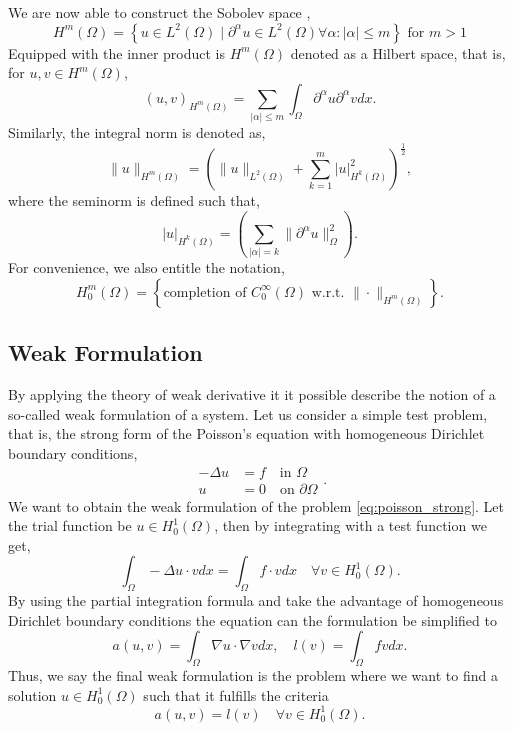 We are now able to construct the Sobolev space \cite{manzoni2021optimal}, \[
H^{m}\left( \Omega  \right) = \left\{ u \in L^{2}\left( \Omega  \right)  \mid  \partial ^{\alpha } u \in L^{2}\left( \Omega  \right)  \forall \alpha : \left\lvert \alpha  \right\rvert  \le m \right\} \text{ for } m>1
\]
Equipped with the inner product is $H^{m}\left( \Omega  \right) $  denoted as a Hilbert space, that is, for $u,v \in H^{m}\left( \Omega  \right) $, \[
    \left( u,v \right) _{H^{m}\left( \Omega   \right) } = \sum_{\left\lvert \alpha  \right\rvert  \le  m}^{}  \int_{\Omega }^{} \partial ^{\alpha } u \partial ^{\alpha } v dx.
\]
Similarly, the integral norm is denoted as, \[
\| u \|_{ H^{m}\left( \Omega  \right)  }^{  }  = \left( \| u \|_{ L^{2}\left( \Omega  \right)    } + \sum_{k = 1}^{m}  \left\lvert u \right\rvert ^{2} _{  H^{k}\left( \Omega  \right) }\right) ^{\frac{1}{2}},
\]
where the seminorm is defined such that, \[
\left\lvert u \right\rvert _{H^{k}\left( \Omega  \right) } = \left( \sum_{\left\lvert \alpha  \right\rvert  = k}^{} \| \partial ^{\alpha }u \|_{ \Omega  }^{ 2 }  \right).
\]
For convenience, we also entitle the notation,
\[
H^{m}_{0} \left( \Omega  \right) = \left\{ \text{completion of }C_{0}^{\infty}\left( \Omega  \right) \text{ w.r.t. } \| \cdot  \|_{H^{m}\left( \Omega  \right)   }^{  }  \right\}.
\]

\subsection{Weak Formulation}%
\label{sub:weak_formulation}

By applying the theory of weak derivative it it possible describe the notion of a so-called weak formulation of a system. Let us consider a simple test problem, that is, the strong form of the Poisson's equation with homogeneous Dirichlet boundary
conditions,
\begin{equation}
\label{eq:poisson_strong}
\begin{split}
-\Delta u & = f \quad \text{in } \Omega \\
u & =0 \quad \text{on } \partial \Omega
\end{split}
.\end{equation}
We want to obtain the weak formulation of the problem \eqref{eq:poisson_strong}. Let the trial function be $u \in H_{0}^{1}\left( \Omega  \right) $, then by integrating with a test function we get, \[
\int_{\Omega }^{} - \Delta u \cdot v dx = \int_{\Omega }^{} f \cdot v dx \quad \forall v \in H^{1}_{0}\left( \Omega  \right).
\]
By using the partial integration formula and take the advantage of homogeneous Dirichlet boundary conditions the equation can the formulation be simplified to \[
a\left( u,v \right) = \int_{\Omega }^{}  \nabla u\cdot \nabla v dx , \quad l\left( v \right)  = \int_{\Omega }^{}  f v dx.
\]
Thus, we say the final weak formulation is the problem where we want to find a solution $u \in H^{1}_{0}\left( \Omega  \right) $  such that it fulfills the criteria
\begin{equation}
\label{eq:poissons_weak_formulation}
a\left( u,v \right) = l\left( v \right) \quad \forall v \in H^{1}_{0}\left( \Omega  \right).
\end{equation}

